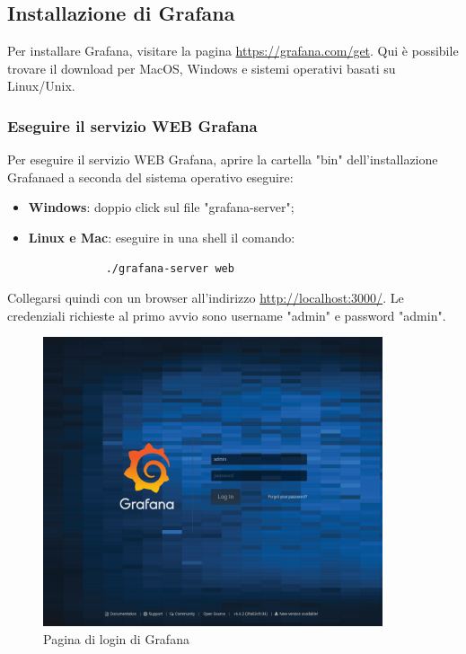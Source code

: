 \subsection{Installazione di Grafana}
Per installare Grafana\glo, visitare la pagina \url{https://grafana.com/get}. Qui è possibile trovare il download per MacOS, Windows e sistemi operativi basati su Linux/Unix.
\subsubsection{Eseguire il servizio WEB Grafana} Per eseguire il servizio WEB Grafana\glo, aprire la cartella "bin" dell'installazione Grafana\glosp ed a seconda del sistema operativo eseguire:
\begin{itemize}
	\item \textbf{Windows}: doppio click sul file "grafana-server";
	\item \textbf{Linux e Mac}: eseguire in una shell il comando:
		\begin{verbatim}
			./grafana-server web
		\end{verbatim}
\end{itemize}
Collegarsi quindi con un browser all'indirizzo \url{http://localhost:3000/}. Le credenziali richieste al primo avvio sono username "admin" e password "admin".
\begin{figure}[H] 	
	\begin{center}
		\includegraphics[width=10cm,height=\textheight,keepaspectratio]{img/grafana-login.png}
	\end{center}
	\caption{Pagina di login di Grafana}	
\end{figure}

